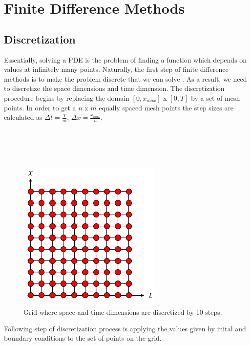 \documentclass[12pt, oneside]{book}
\theoremstyle{plain}
\theoremstyle{definition}
\begin{document}
\section{Finite Difference Methods}
\subsection{Discretization}
Essentially, solving a PDE is the problem of finding a function which depends on values at infinitely many points. Naturally, the first step of finite difference methods is to make the problem discrete that we can solve \cite{jwthomas}. As a result, we need to discretize the space dimensions and time dimension. The discretization procedure begins by replacing the domain $[0, x_{max}]$ x  $[0, T]$  by a set of mesh points. In order to get a $n$ x $m$ equally spaced mesh points the step sizes are calculated as $ \Delta t = \frac{T}{m}$, $\Delta x = \frac{x_{max}}{n}$. \\\\\\\\\\

\begin{figure}[!htb]
    \centering
        \includegraphics[scale = 0.9]{Discretize.png}
    \caption{Grid where space and time dimensions are discretized by 10 steps.}
\end{figure}

Following step of discretization process is applying the values given by inital and boundary conditions to the set of points on the grid.
\end{document}
